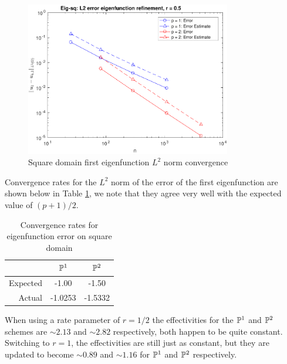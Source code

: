 \documentclass{article}
\begin{document}
\begin{itemize}
	\begin{figure}[H]
		\centering
		\includegraphics[width=0.8\textwidth]{eigsq_eigfun_adapt.pdf}
		\caption{Square domain first eigenfunction \(L^2\) norm convergence}
		\label{fig:eigsq_conv_1}
	\end{figure}
	Convergence rates for the \(L^2 \) norm of the error of the first eigenfunction are shown below in Table \ref{tab:31}, we note that they agree very well with the expected value of \((p+1)/2 \).
	\begin{table}[H]
		\centering
		\begin{tabular}{r||c|c}
			& \(\mathbb{P}^1 \) & \(\mathbb{P}^2 \) \\
			\hline
			Expected & -1.00 & -1.50 \\
			\hline
			Actual & -1.0253 & -1.5332 \\
		\end{tabular}
		\caption{Convergence rates for eigenfunction error on square domain}
		\label{tab:31}
	\end{table}
	When using a rate parameter of \(r = 1/2\) the effectivities for the \(\mathbb{P}^1\) and \(\mathbb{P}^2 \) schemes are \(\sim2.13 \) and \(\sim 2.82 \) respectively, both happen to be quite constant. Switching to \(r = 1\), the effectivities are still just as constant, but they are updated to become  \(\sim0.89 \) and \(\sim 1.16 \) for \(\mathbb{P}^1\) and \(\mathbb{P}^2 \) respectively.
	

\end{itemize}
\end{document}
